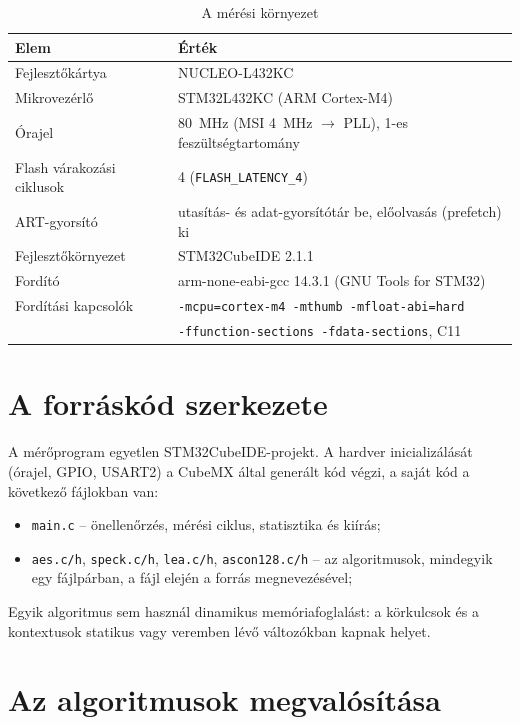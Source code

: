 \documentclass[a4paper,12pt]{report}
\theoremstyle{definition}
\theoremstyle{remark}
\begin{document}
\begin{table}[htbp]
	\centering
	\small
	\caption{A mérési környezet}
	\label{tab:platform}
	\begin{tabular}{|l|l|}
		\hline
		\textbf{Elem} & \textbf{Érték} \\ \hline
		Fejlesztőkártya & NUCLEO-L432KC \\ \hline
		Mikrovezérlő & STM32L432KC (ARM Cortex-M4) \\ \hline
		Órajel & 80~MHz (MSI 4~MHz $\rightarrow$ PLL), 1-es feszültségtartomány \\ \hline
		Flash várakozási ciklusok & 4 (\texttt{FLASH\_LATENCY\_4}) \\ \hline
		ART-gyorsító & utasítás- és adat-gyorsítótár be, előolvasás (prefetch) ki \\ \hline
		Fejlesztőkörnyezet & STM32CubeIDE 2.1.1 \\ \hline
		Fordító & arm-none-eabi-gcc 14.3.1 (GNU Tools for STM32) \\ \hline
		Fordítási kapcsolók & \texttt{-mcpu=cortex-m4 -mthumb -mfloat-abi=hard} \\
		& \texttt{-ffunction-sections -fdata-sections}, C11 \\ \hline
	\end{tabular}
\end{table}

\section{A forráskód szerkezete}

A mérőprogram egyetlen STM32CubeIDE-projekt. A hardver inicializálását (órajel, GPIO, USART2) a CubeMX által generált kód végzi, a saját kód a következő fájlokban van:

\begin{itemize}
	\item \texttt{main.c} -- önellenőrzés, mérési ciklus, statisztika és kiírás;
	\item \texttt{aes.c/h}, \texttt{speck.c/h}, \texttt{lea.c/h}, \texttt{ascon128.c/h} -- az algoritmusok, mindegyik egy fájlpárban, a fájl elején a forrás megnevezésével;
\end{itemize}

Egyik algoritmus sem használ dinamikus memóriafoglalást: a körkulcsok és a kontextusok statikus vagy veremben lévő változókban kapnak helyet.

\section{Az algoritmusok megvalósítása}\label{sec:megvalositas}
\end{document}
